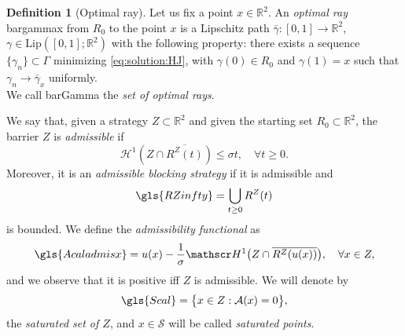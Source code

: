 \documentclass[reqno]{amsart}
\theoremstyle{definition} \newtheorem{definition}{Definition}[section]
\theoremstyle{definition} \newtheorem{remark}[definition]{Remark}
\theoremstyle{plain} \newtheorem{lemma}[definition]{Lemma}
\theoremstyle{plain} \newtheorem{proposition}[definition]{Proposition}
\theoremstyle{plain} \newtheorem{theorem}[definition]{Theorem}
\theoremstyle{plain} \newtheorem{corollary}[definition]{Corollary}
\theoremstyle{definition} \newtheorem{example}[definition]{Example}
\theoremstyle{plain} \newtheorem{claim}[clai]{Claim}
\theoremstyle{definition} \newtheorem{assumption}[definition]{Assumption}
\theoremstyle{definition} \newtheorem{observation}[definition]{Observation}
\newcommand{\R}{\mathbb{R}}
\newcommand{\1}{\mathbbm 1}
\renewcommand{\H}{\mathscr H}
\numberwithin{equation}{section} %
\theoremstyle{plain} \newtheorem*{theorem*}{Theorem}
\theoremstyle{plain} \newtheorem{mthm}[maintheorem]{Main Theorem}
\theoremstyle{plain} \newtheorem*{mthm*}{Main Theorem}
\theoremstyle{plain} \newtheorem*{conjecture*}{Conjecture}
\theoremstyle{plain} \newtheorem{conjecture}[definition]{Conjecture}
\theoremstyle{plain} \newtheorem*{problem*}{Problem}
\begin{document}
\begin{definition}[Optimal ray]
\label{def:optimal:ray}
Let us fix a point $x \in \R^2$. An \emph{optimal ray}  \gls{bargammax} from $R_0$ to the point $x$ is a Lipschitz path $\bar\gamma : [0,1] \rightarrow \R^2$, $\gamma \in \text{Lip}([0,1];\R^2)$ with the following property: there exists a sequence $\lbrace\gamma_n \rbrace \subset \Gamma$ minimizing \eqref{eq:solution:HJ}, with $\gamma(0) \in R_0$ and $\gamma(1) = x$ such that $\gamma_n\to\bar{\gamma}_x$ uniformly. \\ %
We call  \gls{barGamma} the \emph{set of optimal rays}.
\end{definition}

We say that, given a strategy $Z\subset\R^2$ and given the starting set $R_0\subset \R^2$, the barrier $Z$ is \emph{admissible} if
\begin{equation}
\label{Equa:admissbbd}
\H^1(Z \cap \overline{R^Z(t)}) \leq \sigma t,\quad\forall t\geq 0.
\end{equation}
Moreover, it is an \emph{admissible blocking strategy} if it is admissible and 
\begin{equation*}
\gls{RZinfty} = \bigcup_{t\geq 0} R^Z(t)
\end{equation*}
is bounded. We define the \emph{admissibility functional} as 
\begin{equation}
\label{eq:admiss:funct}
\gls{Acaladmisx} = u(x)-\frac{1}{\sigma} \H^1 \big( Z\cap\overline{R^Z(u(x))} \big), \quad\forall x\in Z,
\end{equation}
and we observe that it is positive iff $Z$ is admissible. We will denote by 
\begin{equation}
\label{eq:sat:set}
    \gls{Scal} = \big\lbrace x\in Z: \mathcal{A}(x)=0 \big\rbrace,
\end{equation}
the \emph{saturated set of $Z$}, and $x \in \mathcal{S}$ will be called \emph{saturated points}.
\end{document}
